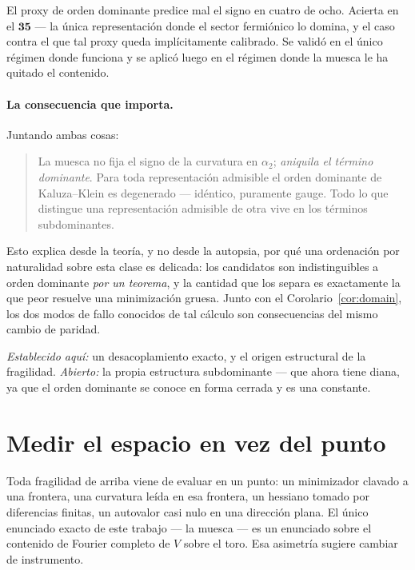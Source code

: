 \documentclass[11pt,a4paper]{article}
\begin{document}
El proxy de orden dominante predice mal el signo en cuatro de ocho. Acierta en el
$\mathbf{35}$ --- la única representación donde el sector fermiónico lo domina, y el caso
contra el que tal proxy queda implícitamente calibrado. Se validó en el único régimen donde
funciona y se aplicó luego en el régimen donde la muesca le ha quitado el contenido.

\paragraph{La consecuencia que importa.} Juntando ambas cosas:

\begin{quote}
La muesca no fija el signo de la curvatura en $\alpha_2$; \emph{aniquila el término
dominante}. Para toda representación admisible el orden dominante de Kaluza--Klein es
degenerado --- idéntico, puramente gauge. Todo lo que distingue una representación admisible
de otra vive en los términos subdominantes.
\end{quote}

Esto explica desde la teoría, y no desde la autopsia, por qué una ordenación por naturalidad
sobre esta clase es delicada: los candidatos son indistinguibles a orden dominante \emph{por
un teorema}, y la cantidad que los separa es exactamente la que peor resuelve una minimización
gruesa. Junto con el Corolario~\ref{cor:domain}, los dos modos de fallo conocidos de tal
cálculo son consecuencias del mismo cambio de paridad.

\emph{Establecido aquí:} un desacoplamiento exacto, y el origen estructural de la fragilidad.
\emph{Abierto:} la propia estructura subdominante --- que ahora tiene diana, ya que el orden
dominante se conoce en forma cerrada y es una constante.

\section{Medir el espacio en vez del punto}\label{sec:basin}
Toda fragilidad de arriba viene de evaluar en un punto: un minimizador clavado a una frontera,
una curvatura leída en esa frontera, un hessiano tomado por diferencias finitas, un autovalor
casi nulo en una dirección plana. El único enunciado exacto de este trabajo --- la muesca ---
es un enunciado sobre el contenido de Fourier completo de $V$ sobre el toro. Esa asimetría
sugiere cambiar de instrumento.
\end{document}
